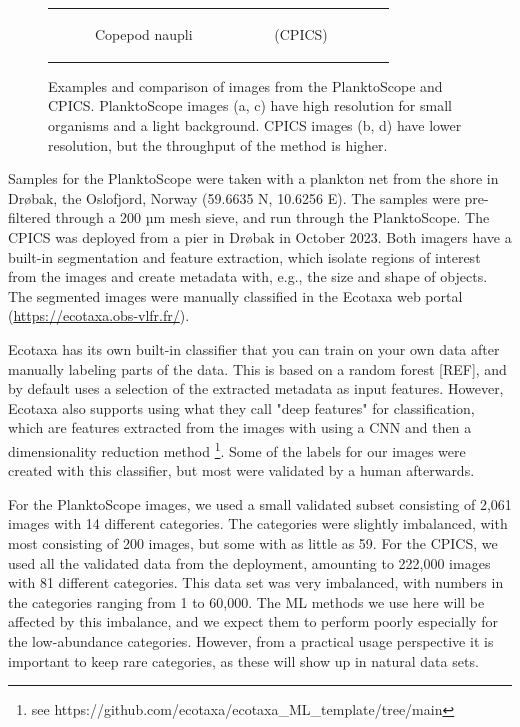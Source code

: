 \begin{figure}[t]
\begin{tabular}{cc}
\begin{subfigure}[b]{0.49\linewidth}
            \caption{Copepod naupli \ \ \ \ \ \ \ \ \ \ \  (CPICS)}
            \label{fig:naupli-cpics}
        \end{subfigure}
    \end{tabular}
    \caption{Examples and comparison of images from the PlanktoScope and CPICS. PlanktoScope images (a, c) have high resolution for small organisms and a light background. CPICS images (b, d) have lower resolution, but the throughput of the method is higher.}
    \label{fig:plankton-img}
\end{figure}

Samples for the PlanktoScope were taken with a plankton net from the shore in Drøbak, the Oslofjord, Norway (59.6635 N, 10.6256 E). The samples were pre-filtered through a 200 µm mesh sieve, and run through the PlanktoScope. The CPICS was deployed from a pier in Drøbak in October 2023. Both imagers have a built-in segmentation and feature extraction, which isolate regions of interest from the images and create metadata with, e.g., the size and shape of objects. The segmented images were manually classified in the Ecotaxa web portal (\hyperlink{https://ecotaxa.obs-vlfr.fr/}{https://ecotaxa.obs-vlfr.fr/}).

Ecotaxa has its own built-in classifier that you can train on your own data after manually labeling parts of the data. This is based on a random forest [REF], and by default uses a selection of the extracted metadata as input features. However, Ecotaxa also supports using what they call "deep features" for classification, which are features extracted from the images with using a CNN and then a dimensionality reduction method \footnote{see https://github.com/ecotaxa/ecotaxa_ML_template/tree/main}. Some of the labels for our images were created with this classifier, but most were validated by a human afterwards.

For the PlanktoScope images, we used a small validated subset consisting of 2,061 images with 14 different categories. The categories were slightly imbalanced, with most consisting of 200 images, but some with as little as 59. For the CPICS, we used all the validated data from the deployment, amounting to 222,000 images with 81 different categories. This data set was very imbalanced, with numbers in the categories ranging from 1 to 60,000. The ML methods we use here will be affected by this imbalance, and we expect them to perform poorly especially for the low-abundance categories. However, from a practical usage perspective it is important to keep rare categories, as these will show up in natural data sets.

